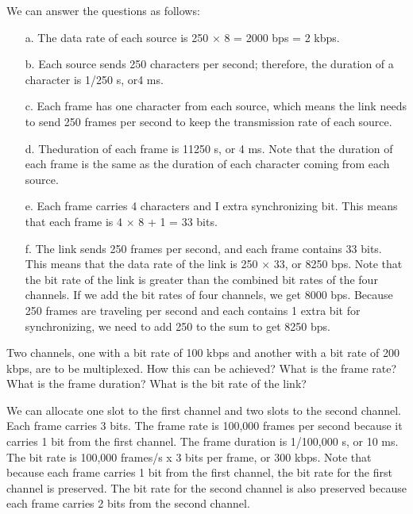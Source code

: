 \begin{solution}
  We can answer the questions as follows: 
  \begin{itemize}
    \item[a.] The data rate of each source is 250 $\times$ 8 = 2000 bps = 2 kbps.
    \item[b.] Each source sends 250 characters per second; therefore, the duration of a character is 1/250 s, or4 ms.
    \item[c.] Each frame has one character from each source, which means the link needs to send 250 frames per second to keep the transmission rate of each source.
    \item[d.] Theduration of each frame is 11250 s, or 4 ms. Note that the duration of each frame is the same as the duration of each character coming from each source.
    \item[e.] Each frame carries 4 characters and I extra synchronizing bit. This means that each frame is 4 $\times$ 8 + 1 = 33 bits.
    \item[f.] The link sends 250 frames per second, and each frame contains 33 bits. This means that the data rate of the link is 250 $\times$ 33, or 8250 bps. Note that the bit rate of the link is greater than the combined bit rates of the four channels. If we add the bit rates of four channels, we get 8000 bps. Because 250 frames are traveling per second and each contains 1 extra bit for synchronizing, we need to add 250 to the sum to get 8250 bps.
  \end{itemize}
\end{solution}

\vspace{12pt}

\begin{example}
  Two channels, one with a bit rate of 100 kbps and another with a bit rate of 200 kbps, are to be multiplexed. How this can be achieved? What is the frame rate? What is the frame duration? What is the bit rate of the link?
  \label{example6:11}
\end{example}

\begin{solution}
  We can allocate one slot to the first channel and two slots to the second channel. Each frame carries 3 bits. The frame rate is 100,000 frames per second because it carries 1 bit from the first channel. The frame duration is 1/100,000 s, or 10 ms. The bit rate is 100,000 frames/s x 3 bits per frame, or 300 kbps. Note that because each frame carries 1 bit from the first channel, the bit rate for the first channel is preserved. The bit rate for the second channel is also preserved because each frame carries 2 bits from the second channel.
\end{solution}

